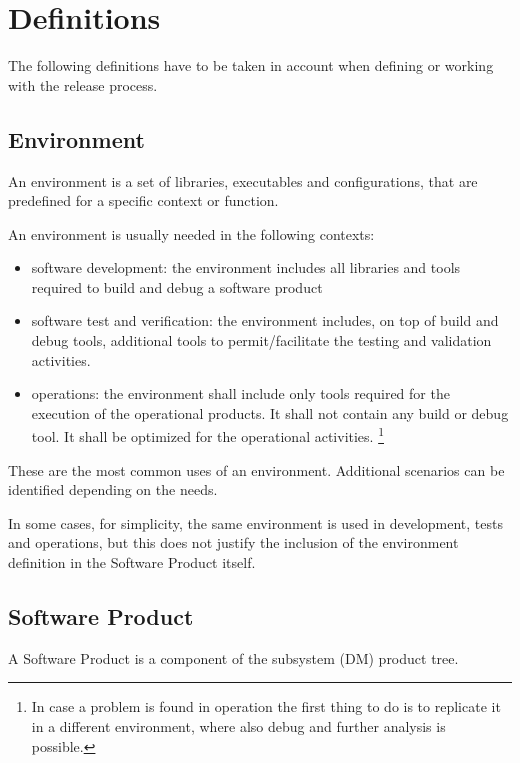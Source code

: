 \section{Definitions} \label{sec:defs}

The following definitions have to be taken in account when defining or working with the release process.


\subsection{Environment} \label{sec:envdef}

An environment is a set of libraries, executables and configurations, that are predefined for a specific context or function.

An environment is usually needed in the following contexts:

\begin{itemize}
\item software development: the environment includes all libraries and tools required to build and debug a software product
\item software test and verification: the environment includes, on top of build and debug tools, additional tools to permit/facilitate the testing and validation activities.
\item operations: the environment shall include only tools required for the execution of the operational products. It shall not contain any build or debug tool. It shall be optimized for the operational activities. \footnote{In case a problem is found in operation the first thing to do is to replicate it in a different environment, where also debug and further analysis is possible.}
\end{itemize}

These are the most common uses of an environment. Additional scenarios can be identified depending on the needs.

In some cases, for simplicity, the same environment is used in development, tests and operations, but this does not justify the inclusion of the environment definition in the Software Product itself.


\subsection{Software Product} \label{sec:swdef}

A Software Product is a component of the subsystem (DM) product tree.

